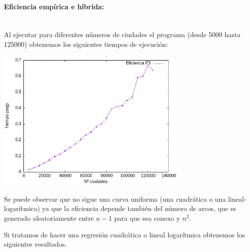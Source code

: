 \documentclass{article}
\newcommand{\myparagraph}[1]{\paragraph{#1}\mbox{}\\}
\begin{document}
\myparagraph{Eficiencia empírica e híbrida:}

Al ejecutar para diferentes números de ciudades el programa (desde 5000 hasta 125000) obtenemos los siguientes tiempos de ejecución:

\begin{center}
    \includegraphics[width=0.7\textwidth]{Problema3/imagenes/timesP3.png}   
\end{center}

Se puede observar que no sigue una curva uniforma (una cuadrática o una lineal-logarítmica) ya que la eficiencia depende también del número de arcos, que es generado aleatoriamente entre $n-1$ para que sea conexo y $n^2$.

Si tratamos de hacer una regresión cuadrática o lineal logarítmica obtenemos los siguientes resultados.
\end{document}
